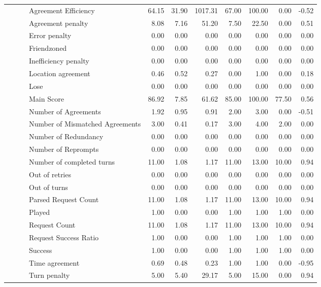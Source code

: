\begin{tabular}{llllrrrrrrr}
 &  &  & Agreement Efficiency & 64.15 & 31.90 & 1017.31 & 67.00 & 100.00 & 0.00 & -0.52 \\
 &  &  & Agreement penalty & 8.08 & 7.16 & 51.20 & 7.50 & 22.50 & 0.00 & 0.51 \\
 &  &  & Error penalty & 0.00 & 0.00 & 0.00 & 0.00 & 0.00 & 0.00 & 0.00 \\
 &  &  & Friendzoned & 0.00 & 0.00 & 0.00 & 0.00 & 0.00 & 0.00 & 0.00 \\
 &  &  & Inefficiency penalty & 0.00 & 0.00 & 0.00 & 0.00 & 0.00 & 0.00 & 0.00 \\
 &  &  & Location agreement & 0.46 & 0.52 & 0.27 & 0.00 & 1.00 & 0.00 & 0.18 \\
 &  &  & Lose & 0.00 & 0.00 & 0.00 & 0.00 & 0.00 & 0.00 & 0.00 \\
 &  &  & Main Score & 86.92 & 7.85 & 61.62 & 85.00 & 100.00 & 77.50 & 0.56 \\
 &  &  & Number of Agreements & 1.92 & 0.95 & 0.91 & 2.00 & 3.00 & 0.00 & -0.51 \\
 &  &  & Number of Mismatched Agreements & 3.00 & 0.41 & 0.17 & 3.00 & 4.00 & 2.00 & 0.00 \\
 &  &  & Number of Redundancy & 0.00 & 0.00 & 0.00 & 0.00 & 0.00 & 0.00 & 0.00 \\
 &  &  & Number of Reprompts & 0.00 & 0.00 & 0.00 & 0.00 & 0.00 & 0.00 & 0.00 \\
 &  &  & Number of completed turns & 11.00 & 1.08 & 1.17 & 11.00 & 13.00 & 10.00 & 0.94 \\
 &  &  & Out of retries & 0.00 & 0.00 & 0.00 & 0.00 & 0.00 & 0.00 & 0.00 \\
 &  &  & Out of turns & 0.00 & 0.00 & 0.00 & 0.00 & 0.00 & 0.00 & 0.00 \\
 &  &  & Parsed Request Count & 11.00 & 1.08 & 1.17 & 11.00 & 13.00 & 10.00 & 0.94 \\
 &  &  & Played & 1.00 & 0.00 & 0.00 & 1.00 & 1.00 & 1.00 & 0.00 \\
 &  &  & Request Count & 11.00 & 1.08 & 1.17 & 11.00 & 13.00 & 10.00 & 0.94 \\
 &  &  & Request Success Ratio & 1.00 & 0.00 & 0.00 & 1.00 & 1.00 & 1.00 & 0.00 \\
 &  &  & Success & 1.00 & 0.00 & 0.00 & 1.00 & 1.00 & 1.00 & 0.00 \\
 &  &  & Time agreement & 0.69 & 0.48 & 0.23 & 1.00 & 1.00 & 0.00 & -0.95 \\
 &  &  & Turn penalty & 5.00 & 5.40 & 29.17 & 5.00 & 15.00 & 0.00 & 0.94 \\

\end{tabular}
